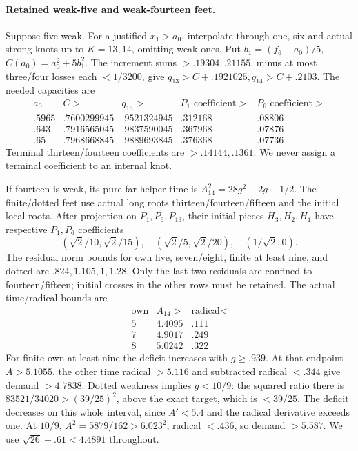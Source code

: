 \documentclass[11pt]{article}
\theoremstyle{definition}
\theoremstyle{remark}
\begin{document}
\paragraph{Retained weak-five and weak-fourteen feet.}
Suppose five weak. For a justified \(x_1>a_0\), interpolate through
one, six and actual strong knots up to \(K=13,14\), omitting weak
ones. Put \(b_1=(f_6-a_0)/5\), \(C(a_0)=a_0^2+5b_1^2\).
The increment sums \(>.19304,.21155\), minus at most three/four
losses each \(<1/3200\), give
\(q_{13}>C+.1921025,q_{14}>C+.2103\). The needed capacities are
\[
\begin{array}{c|c|c|c|c}
a_0&C>&q_{13}>&P_1\text{ coefficient}>&P_6\text{ coefficient}>\\\hline
.5965&.7600299945&.9521324945&.312168&.08806\\
.643&.7916565045&.9837590045&.367968&.07876\\
.65&.7968668845&.9889693845&.376368&.07736
\end{array}
\]
Terminal thirteen/fourteen coefficients are \(>.14144,.1361\).
We never assign a terminal coefficient to an internal knot.

If fourteen is weak, its pure far-helper time is
\(A_{14}^2=28g^2+2g-1/2\). The finite/dotted feet use actual long
roots thirteen/fourteen/fifteen and the initial local roots.
After projection on \(P_1,P_6,P_{13}\), their initial pieces
\(H_3,H_2,H_1\) have respective \(P_1,P_6\) coefficients
\[
 (\sqrt2/10,\sqrt2/15),\quad
 (\sqrt2/5,\sqrt2/20),\quad(1/\sqrt2,0).
\]
The residual norm bounds for own five, seven/eight, finite at least
nine, and dotted are \(.824,\allowbreak 1.105,\allowbreak 1,\allowbreak 1.28\). Only the last two
residuals are confined to fourteen/fifteen; initial crosses in the
other rows must be retained. The actual time/radical bounds are
\[
\begin{array}{c|c|c}
\text{own}&A_{14}>&\text{radical}<\\\hline
5&4.4095&.111\\7&4.9017&.249\\8&5.0242&.322
\end{array}
\]
For finite own at least nine the deficit increases with \(g\ge.939\).
At that endpoint \(A>5.1055\), the other time radical \(>5.116\)
and subtracted radical \(<.344\) give demand \(>4.7838\).
Dotted weakness implies \(g<10/9\): the squared ratio there is
\(83521/34020>(39/25)^2\), above the exact target, which is
\(<39/25\). The deficit decreases on this whole interval, since
\(A'<5.4\) and the radical derivative exceeds one. At \(10/9\),
\(A^2=5879/162>6.023^2\), radical \(<.436\), so demand \(>5.587\).
We use \(\sqrt{26}-.61<4.4891\) throughout.
\end{document}
